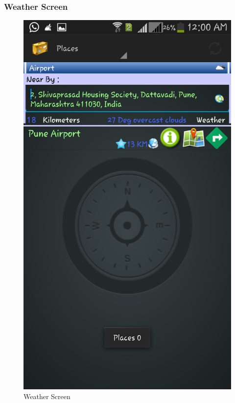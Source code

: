 \documentclass[12pt,a4paper]{article}
\begin{document}
\subsubsection{Weather Screen}
\begin{figure}[!htb]
\centering
\includegraphics[width=12 cm]{weather}
\caption{Weather Screen}
\end{figure}
\\
\end{document}
